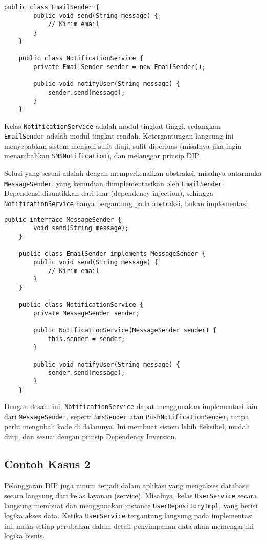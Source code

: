 \begin{lstlisting}[style=JavaStyle, caption={Contoh pelanggaran DIP}]
	public class EmailSender {
		public void send(String message) {
			// Kirim email
		}
	}
	
	public class NotificationService {
		private EmailSender sender = new EmailSender();
		
		public void notifyUser(String message) {
			sender.send(message);
		}
	}
\end{lstlisting}

Kelas \texttt{NotificationService} adalah modul tingkat tinggi, sedangkan \texttt{EmailSender} adalah modul tingkat rendah. Ketergantungan langsung ini menyebabkan sistem menjadi sulit diuji, sulit diperluas (misalnya jika ingin menambahkan \texttt{SMSNotification}), dan melanggar prinsip DIP.

Solusi yang sesuai adalah dengan memperkenalkan abstraksi, misalnya antarmuka \texttt{MessageSender}, yang kemudian diimplementasikan oleh \texttt{EmailSender}. Dependensi disuntikkan dari luar (dependency injection), sehingga \texttt{NotificationService} hanya bergantung pada abstraksi, bukan implementasi.

\begin{lstlisting}[style=JavaStyle, caption={Refaktor menggunakan DIP}]
	public interface MessageSender {
		void send(String message);
	}
	
	public class EmailSender implements MessageSender {
		public void send(String message) {
			// Kirim email
		}
	}
	
	public class NotificationService {
		private MessageSender sender;
		
		public NotificationService(MessageSender sender) {
			this.sender = sender;
		}
		
		public void notifyUser(String message) {
			sender.send(message);
		}
	}
\end{lstlisting}

Dengan desain ini, \texttt{NotificationService} dapat menggunakan implementasi lain dari \texttt{MessageSender}, seperti \texttt{SmsSender} atau \texttt{PushNotificationSender}, tanpa perlu mengubah kode di dalamnya. Ini membuat sistem lebih fleksibel, mudah diuji, dan sesuai dengan prinsip Dependency Inversion.

\subsection{Contoh Kasus 2}
Pelanggaran DIP juga umum terjadi dalam aplikasi yang mengakses database secara langsung dari kelas layanan (service). Misalnya, kelas \texttt{UserService} secara langsung membuat dan menggunakan instance \texttt{UserRepositoryImpl}, yang berisi logika akses data. Ketika \texttt{UserService} tergantung langsung pada implementasi ini, maka setiap perubahan dalam detail penyimpanan data akan memengaruhi logika bisnis.

